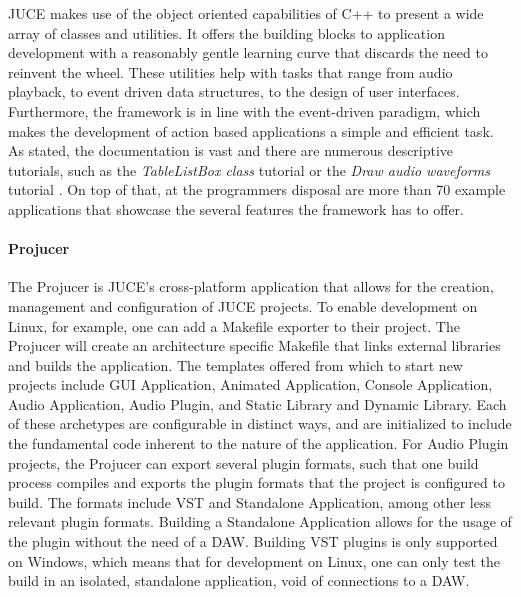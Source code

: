 \documentclass[12pt, a4paper, hidelinks]{report}
\begin{document}
	JUCE makes use of the object oriented capabilities of C++ to present a wide array of classes and utilities. It offers the building blocks to application development with a reasonably gentle learning curve that discards the need to reinvent the wheel. These utilities help with tasks that range from audio playback, to event driven data structures, to the design of user interfaces. Furthermore, the framework is in line with the event-driven paradigm, which makes the development of action based applications a simple and efficient task. As stated, the documentation is vast and there are numerous descriptive tutorials, such as the \textit{TableListBox class} tutorial \cite{tablelistbox} or the \textit{Draw audio waveforms} tutorial \cite{audiothumbnail}. On top of that, at the programmers disposal are more than 70 example applications that showcase the several features the framework has to offer. 
	
	\paragraph{Projucer\\}
	The Projucer is JUCE's cross-platform application that allows for the creation, management and configuration of JUCE projects. To enable development on Linux, for example, one can add a Makefile exporter to their project. The Projucer will create an architecture specific Makefile that links external libraries and builds the application. The templates offered from which to start new projects include GUI Application, Animated Application, Console Application, Audio Application, Audio Plugin, and Static Library and Dynamic Library. Each of these archetypes are configurable in distinct ways, and are initialized to include the fundamental code inherent to the nature of the application. For Audio Plugin projects, the Projucer can export several plugin formats, such that one build process compiles and exports the plugin formats that the project is configured to build. The formats include VST and Standalone Application, among other less relevant plugin formats. Building a Standalone Application allows for the usage of the plugin without the need of a DAW. Building VST plugins is only supported on Windows, which means that for development on Linux, one can only test the build in an isolated, standalone application, void of connections to a DAW. \par
	
\end{document}
